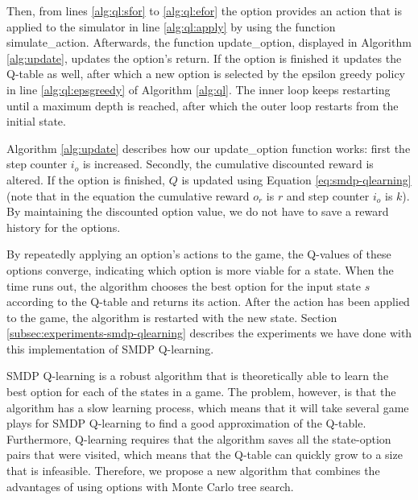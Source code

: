 Then, from lines \ref{alg:ql:sfor} to \ref{alg:ql:efor} the option provides an
action that is applied to the simulator in line \ref{alg:ql:apply} by using the
function \textsf{simulate\_action}.  Afterwards, the function
\textsf{update\_option}, displayed in Algorithm \ref{alg:update}, updates the
option's return.  If the option is finished it updates the Q-table as well,
after which a new option is selected by the epsilon greedy policy in line
\ref{alg:ql:epsgreedy} of Algorithm \ref{alg:ql}. The inner loop keeps
restarting until a maximum depth is reached, after which the outer loop restarts
from the initial state.

Algorithm \ref{alg:update} describes how our \textsf{update\_option}
function works: first the step counter $i_o$ is increased. Secondly, the
cumulative discounted reward is altered. If the option is finished, $Q$ is
updated using Equation \ref{eq:smdp-qlearning} (note that in the equation the
cumulative reward $o_r$ is $r$ and step counter $i_o$ is $k$). By maintaining
the discounted option value, we do not have to save a reward history for the
options.

By repeatedly applying an option's actions to the game, the Q-values of these
options converge, indicating which option is more viable for a state.
When the time runs out, the algorithm chooses the best option for the input
state $s$ according to the Q-table and returns its action. After the action
has been applied to the game, the algorithm is restarted with the new state.
Section \ref{subsec:experiments-smdp-qlearning} describes the experiments we
have done with this implementation of SMDP Q-learning.

SMDP Q-learning is a robust algorithm that is theoretically able to learn the
best option for each of the states in a game. The problem, however, is that the
algorithm has a slow learning process, which means that it will take several
game plays for SMDP Q-learning to find a good approximation of the Q-table.
Furthermore, Q-learning requires that the algorithm saves all the state-option
pairs that were visited, which means that the Q-table can quickly grow to a size
that is infeasible. Therefore, we propose a new algorithm that combines the
advantages of using options with Monte Carlo tree search.
